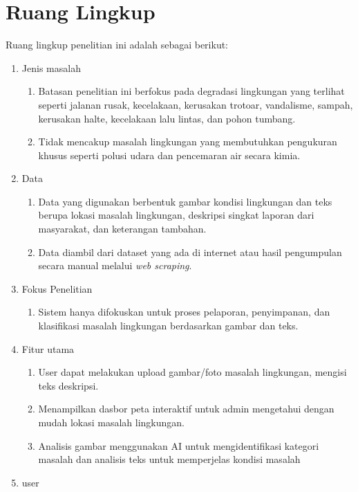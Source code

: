 \section{Ruang Lingkup}
Ruang lingkup penelitian ini adalah sebagai berikut:
\begin{enumerate}
    \item Jenis masalah 
        \begin{enumerate}
            \item Batasan penelitian ini berfokus pada degradasi lingkungan yang terlihat seperti  jalanan rusak, kecelakaan, kerusakan trotoar, vandalisme, sampah, kerusakan halte, kecelakaan lalu lintas, dan pohon tumbang.
            \item Tidak mencakup masalah lingkungan yang membutuhkan pengukuran khusus seperti polusi udara dan pencemaran air secara kimia. 
        \end{enumerate}
    \item Data 
        \begin{enumerate}
            \item Data yang digunakan berbentuk gambar kondisi lingkungan dan teks berupa lokasi masalah lingkungan, deskripsi singkat laporan dari masyarakat, dan keterangan tambahan. 
            \item Data diambil dari dataset yang ada di internet atau hasil pengumpulan secara manual melalui \textit{web scraping}. 
        \end{enumerate}
    \item Fokus Penelitian 
        \begin{enumerate}
            \item Sistem hanya difokuskan untuk proses pelaporan, penyimpanan, dan klasifikasi masalah lingkungan berdasarkan gambar dan teks. 
        \end{enumerate}
    \item Fitur utama
        \begin{enumerate}
            \item User dapat melakukan upload gambar/foto masalah lingkungan, mengisi teks deskripsi. 
            \item Menampilkan dasbor peta interaktif untuk admin mengetahui dengan mudah lokasi masalah lingkungan. 
            \item Analisis gambar menggunakan AI untuk mengidentifikasi kategori masalah dan analisis teks untuk memperjelas kondisi masalah 
        \end{enumerate}
    \item user 

\end{enumerate}
